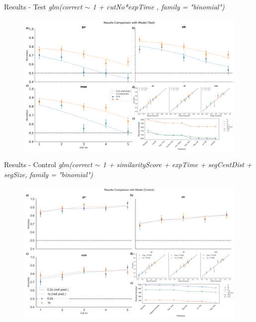 \documentclass[10pt,xcolor=svgnames]{beamer} %
\begin{document}
\begin{frame}{Results - Test}
    \footnotesize  \it{glm(correct $\sim$ 1 + cutNo*expTime , family = "binomial")} \\
    \begin{figure}        
        \hspace*{-0.6cm} 
        \centering
        \includegraphics[width = 1.1\textwidth]{results/test_all.png}    \label{fig:test_all}
    \end{figure}
\end{frame}

\begin{frame}{Results - Control}
    \footnotesize  \it{glm(correct $\sim$ 1 + similarityScore + expTime + segCentDist + segSize, family = "binomial")} \\
    \begin{figure}        
        \hspace*{-0.6cm} 
        \centering
        \includegraphics[width = 1.1\textwidth]{results/cntrl_all.png}    \label{fig:cntrl_all}
    \end{figure}
\end{frame}
\end{document}
